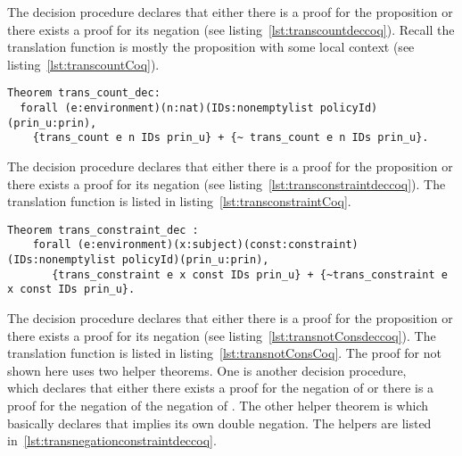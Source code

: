 The decision procedure  declares that either there is a proof for the proposition  or there exists a proof for its negation (see listing~\ref{lst:transcountdeccoq}). Recall the translation function  is mostly the proposition  with some local context (see listing~\ref{lst:transcountCoq}).

\begin{lstlisting}
Theorem trans_count_dec: 
  forall (e:environment)(n:nat)(IDs:nonemptylist policyId)(prin_u:prin), 
    {trans_count e n IDs prin_u} + {~ trans_count e n IDs prin_u}.
\end{lstlisting}

The decision procedure  declares that either there is a proof for the proposition  or there exists a proof for its negation (see listing~\ref{lst:transconstraintdeccoq}). The translation function  is listed in listing~\ref{lst:transconstraintCoq}. 


\begin{minipage}[c]{0.95\textwidth}
\begin{lstlisting}
Theorem trans_constraint_dec :
    forall (e:environment)(x:subject)(const:constraint)(IDs:nonemptylist policyId)(prin_u:prin),
       {trans_constraint e x const IDs prin_u} + {~trans_constraint e x const IDs prin_u}.
\end{lstlisting}
\end{minipage}

The decision procedure  declares that either there is a proof for the proposition  or there exists a proof for its negation (see listing~\ref{lst:transnotConsdeccoq}). The translation function  is listed in listing~\ref{lst:transnotConsCoq}. The proof for  not shown here uses two helper theorems. One is another decision procedure, \\  which declares that either there exists a proof for the negation of  or there is a proof for the negation of the negation of . The other helper theorem is  which basically declares that  implies its own double negation. The helpers are listed in~\ref{lst:transnegationconstraintdeccoq}.

